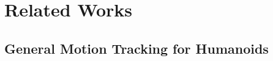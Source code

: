 \documentclass{article}
\begin{document}

\section{Related Works}

\subsection{General Motion Tracking for Humanoids}





	




\end{document}
